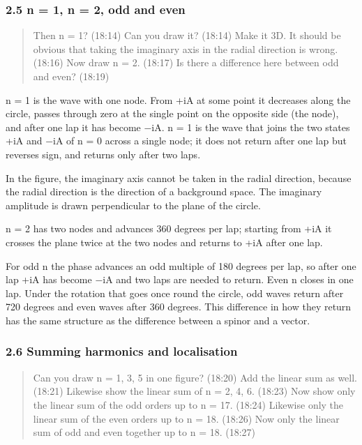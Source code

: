 \documentclass[
  a4paper,
]{article}
\begin{document}
\subsubsection{2.5 n = 1, n = 2, odd and
even}\label{n-1-n-2-odd-and-even}

\begin{quote}
Then n = 1? (18:14) Can you draw it? (18:14) Make it 3D. It should be
obvious that taking the imaginary axis in the radial direction is wrong.
(18:16) Now draw n = 2. (18:17) Is there a difference here between odd
and even? (18:19)
\end{quote}

n = 1 is the wave with one node. From +iA at some point it decreases
along the circle, passes through zero at the single point on the
opposite side (the node), and after one lap it has become −iA. n = 1 is
the wave that joins the two states +iA and −iA of n = 0 across a single
node; it does not return after one lap but reverses sign, and returns
only after two laps.

In the figure, the imaginary axis cannot be taken in the radial
direction, because the radial direction is the direction of a background
space. The imaginary amplitude is drawn perpendicular to the plane of
the circle.

n = 2 has two nodes and advances 360 degrees per lap; starting from +iA
it crosses the plane twice at the two nodes and returns to +iA after one
lap.

For odd n the phase advances an odd multiple of 180 degrees per lap, so
after one lap +iA has become −iA and two laps are needed to return. Even
n closes in one lap. Under the rotation that goes once round the circle,
odd waves return after 720 degrees and even waves after 360 degrees.
This difference in how they return has the same structure as the
difference between a spinor and a vector.

\subsubsection{2.6 Summing harmonics and
localisation}\label{summing-harmonics-and-localisation}

\begin{quote}
Can you draw n = 1, 3, 5 in one figure? (18:20) Add the linear sum as
well. (18:21) Likewise show the linear sum of n = 2, 4, 6. (18:23) Now
show only the linear sum of the odd orders up to n = 17. (18:24)
Likewise only the linear sum of the even orders up to n = 18. (18:26)
Now only the linear sum of odd and even together up to n = 18. (18:27)
\end{quote}
\end{document}
